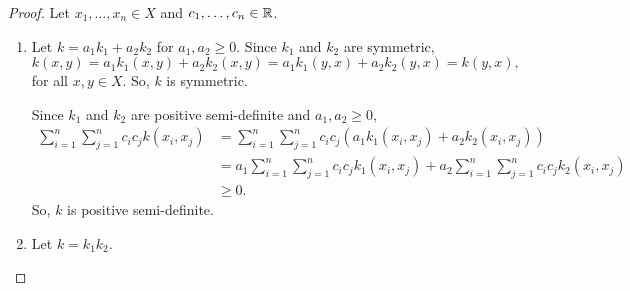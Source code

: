 \begin{proof}
    Let \(x_1, \dots, x_n \in X\) and \(c_1, \dots, c_n \in \mathbb{R}\).
    \begin{enumerate}
        \item \label{itm:kernel-linear-combo}
        Let \(k = a_1k_1 + a_2k_2\) for \(a_1, a_2 \geq 0\).
        Since \(k_1\) and \(k_2\) are symmetric,
        \[
            k(x,y)
            = a_1k_1(x,y) + a_2k_2(x,y)
            = a_1k_1(y,x) + a_2k_2(y,x)
            = k(y,x),
        \]
        for all \(x,y \in X\).
        So, \(k\) is symmetric.

        Since \(k_1\) and \(k_2\) are positive semi-definite and \(a_1, a_2 \geq 0\),
        \begin{align*}
            \sum_{i=1}^{n} \sum_{j=1}^{n} c_i c_j k(x_i,x_j)
            &= \sum_{i=1}^{n} \sum_{j=1}^{n} c_i c_j (a_1 k_1(x_i,x_j) + a_2 k_2(x_i,x_j))\\
            &= a_1 \sum_{i=1}^{n} \sum_{j=1}^{n} c_i c_j k_1(x_i,x_j)
            + a_2 \sum_{i=1}^{n} \sum_{j=1}^{n} c_i c_j k_2(x_i,x_j)\\
            &\geq 0.
        \end{align*}
        So, \(k\) is positive semi-definite.
        \item \label{itm:kernel-product}
        Let \(k = k_1 k_2\).


\end{enumerate}
\end{proof}
